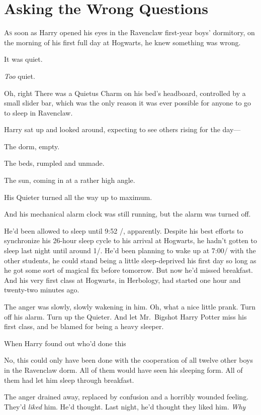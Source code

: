\chapter{Asking the Wrong Questions}

\lettrine{A}{s} soon as Harry opened his eyes in the Ravenclaw first-year boys' dormitory,
on the morning of his first full day at Hogwarts, he knew something was wrong.

It was quiet.

\emph{Too} quiet.

Oh, right{\el} There was a Quietus Charm on his bed's headboard, controlled
by a small slider bar, which was the only reason it was ever possible for
anyone to go to sleep in Ravenclaw.

Harry sat up and looked around, expecting to see others rising for the day---

The dorm, empty.

The beds, rumpled and unmade.

The sun, coming in at a rather high angle.

His Quieter turned all the way up to maximum.

And his mechanical alarm clock was still running, but the alarm was turned off.

He'd been allowed to sleep until 9:52 \AM/, apparently. Despite his best efforts
to synchronize his 26-hour sleep cycle to his arrival at Hogwarts, he hadn't
gotten to sleep last night until around 1\AM/. He'd been planning to wake up at
7:00\AM/ with the other students, he could stand being a little sleep-deprived
his first day so long as he got some sort of magical fix before tomorrow. But
now he'd missed breakfast. And his very first class at Hogwarts, in Herbology,
had started one hour and twenty-two minutes ago.

The anger was slowly, slowly wakening in him. Oh, what a nice little prank.
Turn off his alarm. Turn up the Quieter. And let Mr.~Bigshot Harry Potter miss
his first class, and be blamed for being a heavy sleeper.

When Harry found out who'd done this{\el}

No, this could only have been done with the cooperation of all twelve other
boys in the Ravenclaw dorm. All of them would have seen his sleeping form. All
of them had let him sleep through breakfast.

The anger drained away, replaced by confusion and a horribly wounded feeling.
They'd \emph{liked} him. He'd thought. Last night, he'd thought they liked him.
\emph{Why{\el}}

